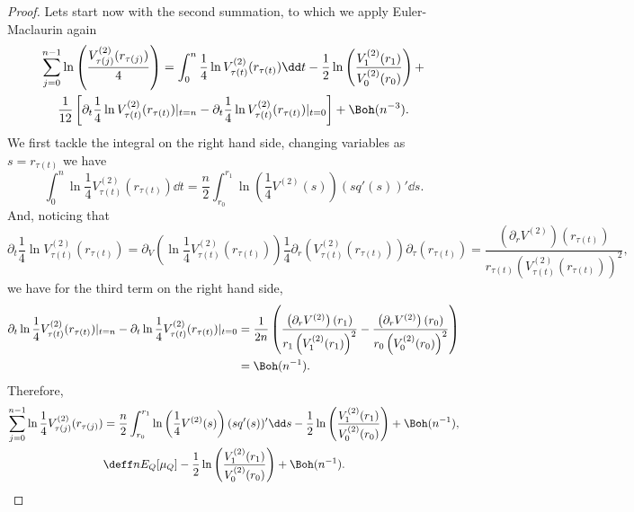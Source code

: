 \begin{proof}
	Lets start now with the second summation, to which we apply Euler-Maclaurin again
	\begin{multline}
		\sum_{j=0}^{n-1} \ln\left(\frac{V^{(2)}_{\tau(j)}(r_{\tau(j)})}{4}\right) = \int_{0}^{n} \frac{1}{4} \ln V^{(2)}_{\tau(t)}(r_{\tau(t)}) \dd t - \frac{1}{2} \ln \left( \frac{V^{(2)}_{1}(r_1)}{V^{(2)}_{0}(r_{0})} \right) + \\ \frac{1}{12} \left[ \partial_t \frac{1}{4} \ln V^{(2)}_{\tau(t)}(r_{\tau(t)}) |_{t=n} - \partial_t \frac{1}{4} \ln V^{(2)}_{\tau(t)}(r_{\tau(t)}) |_{t=0}\right]  + \Boh(n^{-3}).
	\end{multline}
	We first tackle the integral on the right hand side, changing variables as $s = r_{\tau(t)}$ we have
	\begin{equation}
		\int_{0}^{n} \ln \frac{1}{4} V^{(2)}_{\tau(t)}(r_{\tau(t)}) \dd t = \frac{n}{2} \int_{r_0}^{r_1} \ln\left( \frac{1}{4} V^{(2)}(s)\right) (sq'(s))' \dd s.
	\end{equation}
	And, noticing that
	\begin{equation}
		\partial_t \frac{1}{4} \ln V^{(2)}_{\tau(t)}(r_{\tau(t)}) = \partial_V \left( \ln \frac{1}{4} V^{(2)}_{\tau(t)}(r_{\tau(t)}) \right) \frac{1}{4} \partial_r \left( V^{(2)}_{\tau(t)}(r_{\tau(t)}) \right) \partial_\tau \left( r_{\tau(t)} \right) = \frac{\left(\partial_r V^{(2)}\right)(r_{\tau(t)})}{r_{\tau(t)} \left( V^{(2)}_{\tau(t)}(r_{\tau(t)})\right)^2},
	\end{equation}
	we have for the third term on the right hand side, 
	\begin{align}
		\partial_t \ln \frac{1}{4} V^{(2)}_{\tau(t)}(r_{\tau(t)}) |_{t=n} - \partial_t \ln \frac{1}{4} V^{(2)}_{\tau(t)}(r_{\tau(t)}) |_{t=0} & = \frac{1}{2n} \left( \frac{\left(\partial_r V^{(2)}\right)(r_{1})}{r_1 \left( V^{(2)}_1(r_1)\right)^2} - \frac{\left(\partial_r V^{(2)}\right)(r_{0})}{r_0 \left( V^{(2)}_0(r_0)\right)^2}\right) \\ & = \Boh(n^{-1}).
	\end{align}
	Therefore,
	\begin{align}
		\sum_{j=0}^{n-1}  \ln \frac{1}{4} V^{(2)}_{\tau(j)}(r_{\tau(j)})  & = \frac{n}{2} \int_{r_0}^{r_1} \ln\left(\frac{1}{4} V^{(2)}(s)\right) (sq'(s))' \dd s  -   \frac{1}{2} \ln \left( \frac{V^{(2)}_{1}(r_1)}{V^{(2)}_{0}(r_{0})} \right) + \Boh(n^{-1}), \\
		& \deff n E_Q[\mu_Q]  -   \frac{1}{2} \ln \left( \frac{V^{(2)}_{1}(r_1)}{V^{(2)}_{0}(r_{0})} \right) + \Boh(n^{-1}).		
		\label{Equation: logV annulus}
	\end{align}
	

\end{proof}
